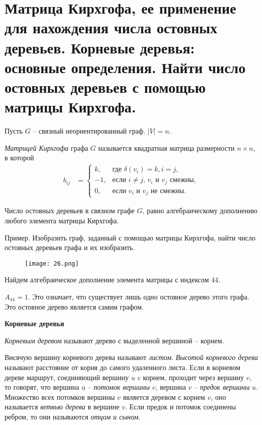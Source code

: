 \section{Матрица Кирхгофа, ее применение для нахождения числа остовных деревьев. Корневые деревья: 
основные определения. Найти число остовных деревьев с помощью матрицы Кирхгофа.}

Пусть $G$ -- связный неориентированный граф. $|V| = n$.

\begin{definition}
    \textit{Матрицей Кирхгофа} графа $G$ называется квадратная матрица
    размерности $n \times n$, в которой
    \begin{align*}
        b_{ij}&=\begin{cases}
            k,&  \text{где $\delta(v_i)=k, i=j$},\\
            -1,& \text{если $i \neq j$, $v_i$ и $v_j$ смежны}, \\
            0,&  \text{если $v_i$ и $v_j$ не смежны}.
            \end{cases}
    \end{align*}
\end{definition}

\begin{theorem}
    Число остовных деревьев в связном графе $G$, равно алгебраическому
    дополнению любого элемента матрицы Кирхгофа.
\end{theorem}

Пример. Изобразить граф, заданный с помощью матрицы Кирхгофа, найти
число остовных деревьев графа и их изобразить.
\begin{figure}[h]
    \centering
    \texttt{[image: 26.png]}
\end{figure}

Найдем алгебраическое дополнение элемента матрицы с индексом 44.

$A_{44} = 1$. Это означает, что существует лишь одно остовное дерево этого графа.
Это остовное дерево является самим графом.

\newpage
\textbf{Корневые деревья}
\begin{definition}
    \textit{Корневым деревом} называют дерево с выделенной вершиной --
    корнем.
\end{definition}

\begin{definition}
    Висячую вершину корневого дерева называют \textit{листом}.
    \textit{Высотой корневого дерева} называют расстояние от корня до самого
    удаленного листа. Если в корневом дереве маршрут, соединяющий вершину $u$
    c корнем, проходит через вершину $v$, то говорят, что вершина u -- \textit{потомок
    вершины} $v$, вершина $v$ -- \textit{предок вершины} $u$. Множество всех потомков
    вершины $v$ является деревом с корнем $v$, оно называется \textit{ветвью дерева} в
    вершине $v$. Если предок и потомок соединены ребром, то они называются
    \textit{отцом и сыном}.
\end{definition}

